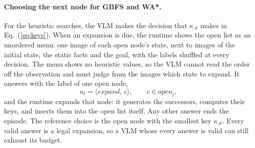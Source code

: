 \paragraph{Choosing the next node for GBFS and WA*.} For the heuristic searches, the VLM makes the decision that $\kappa_{\mathcal{A}}$ makes in Eq.~(\ref{eq:keys}). When an expansion is due, the runtime shows the open list as an unordered menu: one image of each open node's state, next to images of the initial state, the static facts and the goal, with the labels shuffled at every decision. The menu shows no heuristic values, so the VLM cannot read the order off the observation and must judge from the images which state to expand. It answers with the label of one open node,
\begin{equation}
a_t = \langle \mathit{expand},\, c\rangle, \qquad c \in \mathit{open}_t,
\label{eq:choice}
\end{equation}
and the runtime expands that node: it generates the successors, computes their keys, and inserts them into the open list itself. Any other answer ends the episode. The reference choice is the open node with the smallest key $\kappa_{\mathcal{A}}$. Every valid answer is a legal expansion, so a VLM whose every answer is valid can still exhaust its budget.

